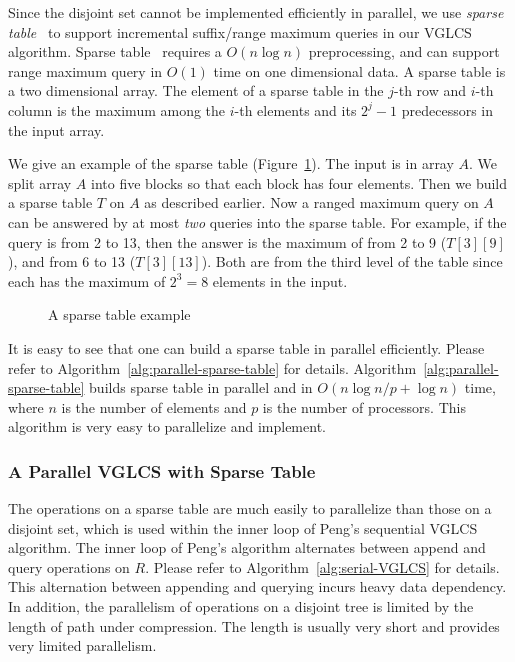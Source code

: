 Since the disjoint set cannot be implemented efficiently in parallel,
we use {\em sparse table}~\cite{Berkman1993RecursiveSP} to support
incremental suffix/range maximum queries in our VGLCS algorithm.
Sparse table~\cite{Berkman1993RecursiveSP} requires a $O(n \log n)$
preprocessing, and can support range maximum query in $O(1)$ time on
one dimensional data.  A sparse table is a two dimensional array.  The
element of a sparse table in the $j$-th row and $i$-th column is the
maximum among the $i$-th elements and its $2^j - 1$ predecessors in
the input array.

We give an example of the sparse table
(Figure~\ref{fig:interval-decomposition}).  The input is in array $A$.
We split array $A$ into five blocks so that each block has four
elements.  Then we build a sparse table $T$ on $A$ as described earlier.
Now a ranged maximum query on $A$ can be answered by at most {\em two}
queries into the sparse table.  For example, if the query is from 2 to
13, then the answer is the maximum of from 2 to 9 ($T[3][9]$), and from
6 to 13 ($T[3][13]$).  Both are from the third level of the table since
each has the maximum of $2^3 = 8$ elements in the input.

\begin{figure}[!thb]
  \centering {} 
  \caption{A sparse table example}
  \label{fig:interval-decomposition}
\end{figure}

It is easy to see that one can build a sparse table in parallel
efficiently.  Please refer to
Algorithm~\ref{alg:parallel-sparse-table} for details.
Algorithm~\ref{alg:parallel-sparse-table} builds sparse table in
parallel and in $O(n \log n / p + \log n)$ time, where $n$ is the
number of elements and $p$ is the number of processors.  This
algorithm is very easy to parallelize and implement.



\subsubsection{A Parallel VGLCS with Sparse Table}

The operations on a sparse table are much easily to parallelize than
those on a disjoint set, which is used within the inner loop of Peng's
sequential VGLCS algorithm.  The inner loop of Peng's algorithm
alternates between append and query operations on $R$.  Please refer
to Algorithm~\ref{alg:serial-VGLCS} for details.  This alternation
between appending and querying incurs heavy data dependency.  In
addition, the parallelism of operations on a disjoint tree is limited
by the length of path under compression.  The length is usually very
short and provides very limited parallelism.

